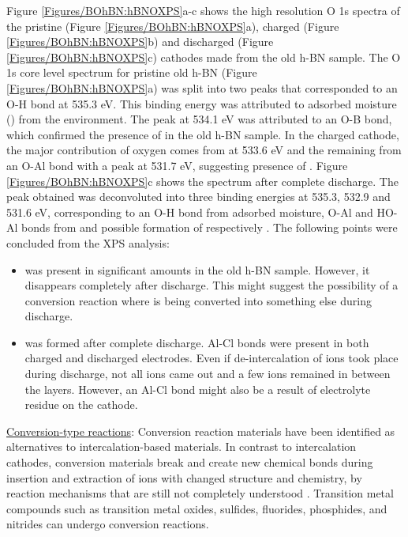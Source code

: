 Figure \ref{Figures/BOhBN:hBNOXPS}a-c shows the high resolution O 1s spectra of the pristine (Figure \ref{Figures/BOhBN:hBNOXPS}a), charged (Figure \ref{Figures/BOhBN:hBNOXPS}b) and discharged (Figure \ref{Figures/BOhBN:hBNOXPS}c) cathodes made from the old h-BN sample. The O 1s core level spectrum for pristine old h-BN (Figure \ref{Figures/BOhBN:hBNOXPS}a) was split into two peaks that corresponded to an O-H bond at 535.3 eV. This binding energy was attributed to adsorbed moisture () from the environment. The peak at 534.1 eV was attributed to an O-B bond, which confirmed the presence of  in the old h-BN sample. In the charged cathode, the major contribution of oxygen comes from  at 533.6 eV and the remaining from an O-Al bond with a peak at 531.7 eV, suggesting presence of .  Figure \ref{Figures/BOhBN:hBNOXPS}c shows the spectrum after complete discharge. The peak obtained was deconvoluted into three binding energies at 535.3, 532.9 and 531.6 eV, corresponding to an O-H bond from adsorbed moisture, O-Al and HO-Al bonds from  and possible formation of  respectively \cite{}. The following points were concluded from the XPS analysis:
\begin{itemize}
    \item {} was present in significant amounts in the old h-BN sample. However, it disappears completely after discharge. This might suggest the possibility of a conversion reaction where  is being converted into something else during discharge.  
    \item {} was formed after complete discharge. Al-Cl bonds were present in both charged and discharged electrodes. Even if de-intercalation of ions took place during discharge, not all ions came out and a few  ions remained in between the layers. However, an Al-Cl bond might also be a result of electrolyte residue on the cathode. 
\end{itemize}

\underline{Conversion-type reactions}: Conversion reaction materials have been identified as alternatives to intercalation-based materials. In contrast to intercalation cathodes, conversion materials break and create new chemical bonds during insertion and extraction of ions with changed structure and chemistry, by reaction mechanisms that are still not completely understood \cite{wu_con}. Transition metal compounds such as transition metal oxides, sulfides, fluorides, phosphides, and nitrides can undergo conversion reactions.

